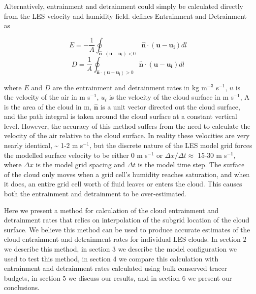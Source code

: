 \documentclass[12pt]{article}
\begin{document}
Alternatively, entrainment and detrainment could simply be calculated
directly from the LES velocity and humidity field.  \cite{Siebesma1998} 
defines Entrainment and Detrainment as

\begin{equation}
E = -\frac{1}{A}\oint_{\mathbf{\hat{n}}\cdot(\mathbf{u} - \mathbf{u_i}) < 0}
\mathbf{\hat{n}}\cdot(\mathbf{u}-\mathbf{u_i})dl
\end{equation}
\begin{equation}
D = \frac{1}{A}\oint_{\mathbf{\hat{n}}\cdot(\mathbf{u} - \mathbf{u_i}) > 0}
\mathbf{\hat{n}}\cdot(\mathbf{u}-\mathbf{u_i})dl
\end{equation}

where $E$ and $D$ are the entrainment and detrainment rates in kg 
m$^{-3}$ s$^{-1}$, $u$ is the velocity of the air in m s$^{-1}$, $u_i$ is the 
velocity of the cloud surface in m s$^{-1}$, A is the area of the cloud in m,
$\mathbf{\hat{n}}$ is a unit vector directed out the cloud surface, and the 
path integral is taken around the cloud surface at a constant vertical level.
However, the accuracy of this method suffers from the need to calculate the 
velocity of the air relative to the cloud surface.  In reality these velocities 
are very nearly identical, \textasciitilde{} 1-2 m s$^{-1}$, but the discrete 
nature of the LES model grid forces the modelled surface velocity to be either 
0 m s$^{-1}$ or $\Delta x / \Delta t \approx$ 15-30 m s$^{-1}$, where 
$\Delta x$ is the model grid spacing and $\Delta t$ is the model time step.  The
surface of the cloud only moves when a grid cell's humidity reaches saturation, 
and when it does, an entire grid cell worth of fluid leaves or enters the cloud.
This causes both the entrainment and detrainment to be over-estimated.

Here we present a method for calculation of the cloud entrainment and 
detrainment rates that relies on interpolation of the subgrid location 
of the cloud surface.  We believe this method can be used to produce accurate
estimates of the cloud entrainment and detrainment rates for individual LES
clouds.  In section 2 we describe this method, in section 3 we describe the 
model configuration we used to test this method, in section 4 we compare this
calculation with entrainment and detrainment rates calculated using bulk
conserved tracer budgets, in section 5 we discuss our results, and in section 6
we present our conclusions.  

\end{document}
